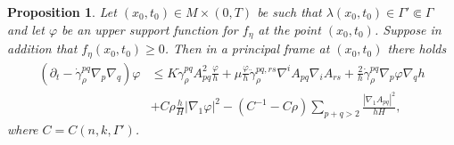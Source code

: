 \documentclass[12pt]{amsart}
\newtheorem{proposition}[theorem]{Proposition}
\begin{document}
\begin{proposition}
\label{prop:f_evol_est}
Let $(x_0,t_0)\in M\times (0,T)$ be such that $\lambda(x_0,t_0) \in \Gamma' \Subset \Gamma$ and let $\varphi$ be an upper support function for $f_\eta$ at the point $(x_0,t_0)$. Suppose in addition that $f_\eta(x_0,t_0) \geq 0$. Then in a principal frame at $(x_0,t_0)$ there holds 
\begin{align*}
(\partial_t - \dot \gamma_\rho^{pq}\nabla_p \nabla_q) \varphi & \leq K\dot \gamma_\rho^{pq} A^2_{pq}\frac{\varphi}{h}  + \mu\frac{\varphi}{h} \ddot \gamma_\rho^{pq,rs}  \nabla^i A_{pq} \nabla_i A_{rs}+ \frac{2}{h} \dot \gamma_\rho^{pq} \nabla_p \varphi \nabla_q h\\
&+ C\rho \frac{h}{H} |\nabla_1 \varphi|^2  -(C^{-1}- C \rho) \sum_{p+q> 2} \frac{|\nabla_1 A_{pq}|^2}{h H},
\end{align*}
where $C=C(n,k,\Gamma')$.
\end{proposition}
\end{document}
